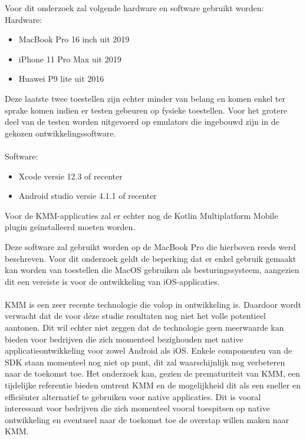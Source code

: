 Voor dit onderzoek zal volgende hardware en software gebruikt worden:\\
Hardware:
\begin{itemize}
    \item MacBook Pro 16 inch uit 2019
    \item iPhone 11 Pro Max uit 2019
    \item Huawei P9 lite uit 2016
\end{itemize}
Deze laatste twee toestellen zijn echter minder van belang en komen enkel ter sprake komen indien er testen gebeuren op fysieke toestellen. Voor het grotere deel van de testen worden uitgevoerd op emulators die ingebouwd zijn in de gekozen ontwikkelingssoftware.\\
\\
Software:
\begin{itemize}
    \item Xcode versie 12.3 of recenter
    \item Android studio versie 4.1.1 of recenter
\end{itemize}
Voor de KMM-applicaties zal er echter nog de Kotlin Multiplatform Mobile plugin geïnstalleerd moeten worden.

Deze software zal gebruikt worden op de MacBook Pro die hierboven reeds werd beschreven. Voor dit onderzoek geldt de beperking dat er enkel gebruik gemaakt kan worden van toestellen die MacOS gebruiken als besturingssysteem, aangezien dit een vereiste is voor de ontwikkeling van iOS-applicaties.
\\ \\ 
KMM is een zeer recente technologie die volop in ontwikkeling is. Daardoor wordt verwacht dat de voor deze studie resultaten nog niet het volle potentieel aantonen. Dit wil echter niet zeggen dat de technologie geen meerwaarde kan bieden voor bedrijven die zich momenteel bezighouden met native applicatieontwikkeling voor zowel Android als iOS. Enkele componenten van de SDK staan momenteel nog niet op punt, dit zal waarschijnlijk nog verbeteren naar de toekomst toe. Het onderzoek kan, gezien de prematuriteit van KMM, een tijdelijke referentie bieden omtrent KMM en de mogelijkheid dit als een sneller en efficiënter alternatief te gebruiken voor native applicaties. Dit is vooral interessant voor bedrijven die zich momenteel vooral toespitsen op native ontwikkeling en eventueel naar de toekomst toe de overstap willen maken naar KMM. 



